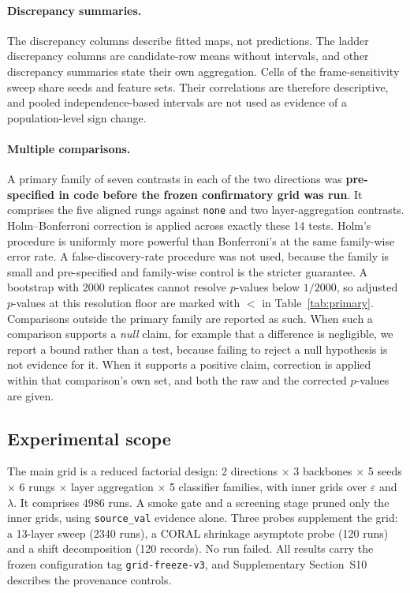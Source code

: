 \paragraph{Discrepancy summaries.} The discrepancy columns describe fitted
maps, not predictions. The ladder discrepancy columns are candidate-row means
without intervals, and other discrepancy summaries state their own aggregation.
Cells of the frame-sensitivity sweep share seeds and feature sets. Their
correlations are therefore descriptive, and pooled independence-based
intervals are not used as evidence of a population-level sign change.

\paragraph{Multiple comparisons.} A primary family of seven contrasts in each
of the two directions was \textbf{pre-specified in code before the frozen
confirmatory grid was run}. It comprises the five aligned rungs against
\texttt{none} and two layer-aggregation contrasts. Holm--Bonferroni correction
\cite{holm1979sequential} is applied across exactly these 14 tests. Holm's
procedure is uniformly more powerful than Bonferroni's at the same family-wise
error rate. A false-discovery-rate procedure was not used, because the family
is small and pre-specified and family-wise control is the stricter guarantee.
A bootstrap with 2000 replicates cannot resolve $p$-values below $1/2000$, so
adjusted $p$-values at this resolution floor are marked with $<$ in
Table~\ref{tab:primary}. Comparisons outside the primary family are reported as
such. When such a comparison supports a \emph{null} claim, for example that a
difference is negligible, we report a bound rather than a test, because failing
to reject a null hypothesis is not evidence for it. When it supports a positive
claim, correction is applied within that comparison's own set, and both the raw
and the corrected $p$-values are given.

\subsection{Experimental scope}
\label{sec:scope}

The main grid is a reduced factorial design: 2 directions $\times$
3 backbones $\times$ 5 seeds $\times$ 6 rungs $\times$ layer aggregation
$\times$ 5 classifier families, with inner grids over $\varepsilon$ and
$\lambda$. It comprises 4986 runs. A smoke gate and a screening stage pruned
only the inner grids, using \texttt{source\_val} evidence alone. Three probes
supplement the grid: a 13-layer sweep (2340 runs), a CORAL shrinkage asymptote
probe (120 runs) and a shift decomposition (120 records). No run failed. All
results carry the frozen configuration tag \texttt{grid-freeze-v3}, and
Supplementary Section~S10 describes the provenance controls.

